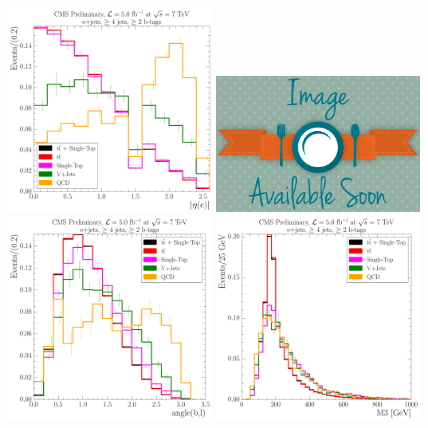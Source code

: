 \begin{figure}[hbtp]
    \centering
     \includegraphics[width=0.48\textwidth]{Chapters/04_Analysis/04b_XSections/images/7TeV/fit_variables/MET/electron_absolute_eta/MET_inclusive_electron_absolute_eta_2orMoreBtags_templates.pdf}\hfill
     \includegraphics[width=0.48\textwidth]{Chapters/04_Analysis/04b_XSections/images/placeholder.png}\\
     \includegraphics[width=0.48\textwidth]{Chapters/04_Analysis/04b_XSections/images/7TeV/fit_variables/MET/angle_bl/MET_inclusive_angle_bl_2orMoreBtags_templates.pdf}\hfill
     \includegraphics[width=0.48\textwidth]{Chapters/04_Analysis/04b_XSections/images/7TeV/fit_variables/MET/M3/MET_inclusive_M3_2orMoreBtags_templates.pdf}\\

\end{figure}
